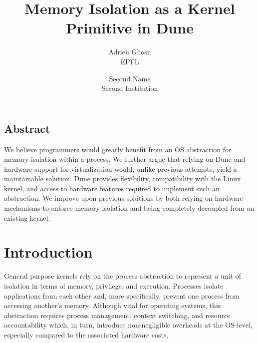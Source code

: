 \documentclass[letterpaper,twocolumn,10pt]{article}
\begin{document}
\date{}

\title{\Large \bf Memory Isolation as a Kernel Primitive in Dune}

\author{
{\rm Adrien Ghosn}\\
EPFL
\and
{\rm Second Name}\\
Second Institution
} %

\maketitle

\thispagestyle{empty}


\subsection*{Abstract}

We believe programmers would greatly benefit from an OS abstraction for memory isolation within a process.
We further argue that relying on Dune and hardware support for virtualization would, unlike previous attempts, yield a maintainable solution.
Dune provides flexibility, compatibility with the Linux kernel, and access to hardware features required to implement such an abstraction.
We improve upon previous solutions by both relying on hardware mechanisms to enforce memory isolation and being completely decoupled from an existing kernel.

\section{Introduction}
General purpose kernels rely on the process abstraction to represent a unit of isolation in terms of memory, privilege, and execution.
Processes isolate applications from each other and, more specifically, prevent one process from accessing another's memory.
Although vital for operating systems, this abstraction requires process management, context switching, and resource accountability which, in turn, introduce non-negligible overheads at the OS-level, especially compared to the associated hardware costs. \\
\end{document}
